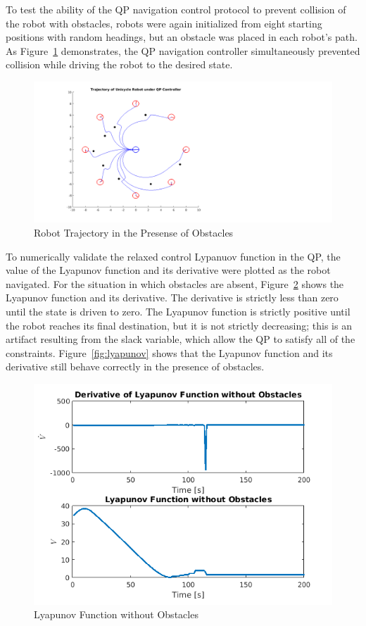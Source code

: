 \documentclass[journal]{IEEEtran}
\begin{document}
To test the ability of the QP navigation control protocol to prevent collision of the robot with obstacles, robots were again initialized from eight starting positions with random headings, but an obstacle was placed in each robot's path. As Figure~\ref{fig:octoplot} demonstrates, the QP navigation controller simultaneously prevented collision while driving the robot to the desired state.

\begin{figure}[h!]
\centering
\includegraphics[scale=0.4]{octoPlotProofEditSqur.png} 
\caption{Robot Trajectory in the Presense of Obstacles\label{fig:octoplot}} 
\end{figure}

To numerically validate the relaxed control Lypanuov function in the QP, the value of the Lyapunov function and its derivative were plotted as the robot navigated. For the situation in which obstacles are absent, Figure~\ref{fig:lyapunovsans} shows the Lyapunov function and its derivative. The derivative is strictly less than zero until the state is driven to zero. The Lyapunov function is strictly positive until the robot reaches its final destination, but it is not strictly decreasing; this is an artifact resulting from the slack variable, which allow the QP to satisfy all of the constraints. Figure~\ref{fig:lyapunov} shows that the Lyapunov function and its derivative still behave correctly in the presence of obstacles.

\begin{figure}[h!]
\centering
\includegraphics[scale=0.63]{vsans1.png} 
\caption{Lyapunov Function without Obstacles\label{fig:lyapunovsans}} 
\end{figure}
\end{document}

